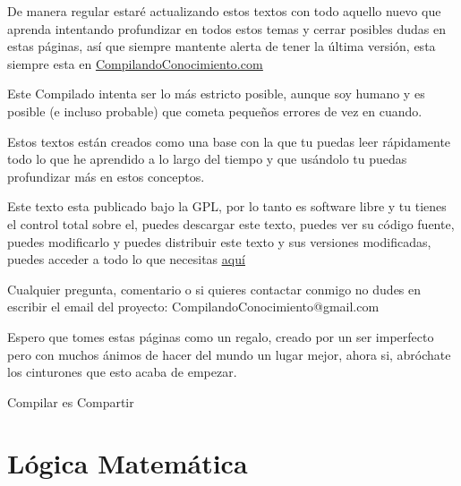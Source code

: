 \documentclass[12pt, fleqn]{report}                             %
\begin{document}
    De manera regular estaré actualizando estos textos con todo aquello nuevo que aprenda intentando
    profundizar en todos estos temas y cerrar posibles dudas en estas páginas, así que siempre mantente
    alerta de tener la última versión, esta siempre esta en \href{http://www.CompilandoConocimiento.com}
    {\underline{CompilandoConocimiento.com}} 

    Este Compilado intenta ser lo más estricto posible, aunque soy humano y es posible (e incluso probable) que
    cometa pequeños errores de vez en cuando.

    Estos textos están creados como una base con la que tu puedas leer rápidamente todo lo que he aprendido
    a lo largo del tiempo y que usándolo tu puedas profundizar más en estos conceptos.

    Este texto esta publicado bajo la GPL, por lo tanto es software libre y tu tienes el control total sobre
    el, puedes descargar este texto, puedes ver su código fuente, puedes modificarlo y puedes distribuir este
    texto y sus versiones modificadas, puedes acceder a todo lo que necesitas 
    \href{http://www.github.com/CompilandoConocimiento/LibroMatematicasDiscretas}{\underline{aquí}} 

    Cualquier pregunta, comentario o si quieres contactar conmigo no dudes en escribir el email del proyecto:
    CompilandoConocimiento@gmail.com

    Espero que tomes estas páginas como un regalo, creado por un ser imperfecto pero con muchos ánimos de hacer
    del mundo un lugar mejor, ahora si, abróchate los cinturones que esto acaba de empezar.

    \begin{flushright}
        Compilar es Compartir
    \end{flushright}





\part{Lógica Matemática}
\end{document}
